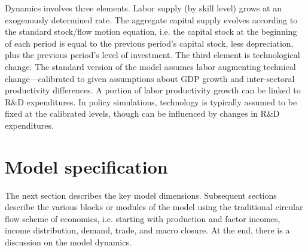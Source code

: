 \documentclass[11pt,letterpaper]{report}
\begin{document}
Dynamics involves three elements. Labor supply (by skill level) grows at an
exogenously determined rate. The aggregate capital supply evolves according to
the standard stock/flow motion equation, i.e. the capital stock at the beginning
of each period is equal to the previous period's capital stock, less
depreciation, plus the previous period's level of investment. The third element
is technological change. The standard version of the model assumes labor
augmenting technical change---calibrated to given assumptions about GDP growth
and inter-sectoral productivity differences. A portion of labor productivity
growth can be linked to R\&D expenditures. In policy simulations, technology
is typically assumed to be fixed at the calibrated levels, though can be
influenced by changes in R\&D expenditures.

\chapter{Model specification}

The next section describes the key model dimensions. Subsequent sections
describe the various blocks or modules of the model using the traditional
circular flow scheme of economics, i.e. starting with production and factor
incomes, income distribution, demand, trade, and macro closure. At the end,
there is a discussion on the model dynamics.
\end{document}
